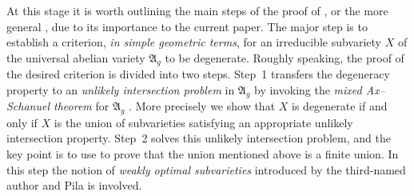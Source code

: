 At this stage it is worth outlining the main steps of the proof of \cite[Theorem~1.2']{GaoBettiRank}, or the more general \cite[Theorem~1.3]{GaoBettiRank}, due to its importance to the current paper. The major step is to establish a criterion, \textit{in simple geometric terms}, for an irreducible subvariety $X$ of the universal abelian variety $\mathfrak{A}_g$ to be degenerate. Roughly speaking, the proof of the desired criterion is divided into two steps. Step~1 transfers the degeneracy property to an \textit{unlikely intersection problem} in $\mathfrak{A}_g$ by invoking the \textit{mixed Ax--Schanuel theorem} for $\mathfrak{A}_g$ \cite[Theorem~1.1]{GaoMixedAS}. More precisely we show that $X$ is degenerate if and only if $X$ is the union of subvarieties satisfying an appropriate unlikely intersection property. Step~2 solves this unlikely intersection problem, and the key point is to use \cite[Theorem~1.4]{GaoMixedAS} to prove that the union mentioned above is a finite union. In this step the notion of \textit{weakly optimal subvarieties} introduced by the third-named author and Pila \cite{HabeggerPilaENS} is involved.




